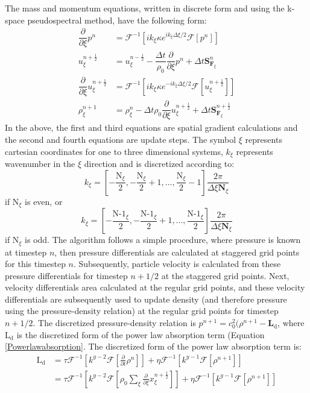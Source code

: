 \documentclass[10pt,a4paper]{article}
\begin{document}
The mass and momentum equations, written in discrete form and using the k-space pseudospectral method, have the following form:
\begin{align}
\dfrac{\partial}{\partial \xi} p^n &= \mathcal{F}^{-1} \left[ i k_{\xi} \kappa e^{ i k_{\xi} \Delta \xi /2} \mathcal{F} \left[ p^n \right] \right] \\
u_{\xi}^{n+\frac{1}{2}} &= u_{\xi}^{n-\frac{1}{2}} - \dfrac{\Delta t}{\rho_0} \dfrac{\partial}{\partial \xi} p^n + \Delta t \textbf{S}_{\textbf{F}_{\xi}}^n\\
\dfrac{\partial}{\partial \xi} u_{\xi}^{n+\frac{1}{2}} &= \mathcal{F}^{-1} \left[ i k_{\xi} \kappa e^{-ik_{\xi} \Delta \xi / 2} \mathcal{F} \left[ u_{\xi}^{n+\frac{1}{2}} \right] \right]\\
\rho_{\xi}^{n+1} &= \rho_{\xi}^n - \Delta t \rho_0 \dfrac{\partial}{\partial \xi} u_{\xi}^{n+\frac{1}{2}} + \Delta t  \textbf{S}_{\textbf{F}_{\xi}}^{n+\frac{1}{2}}
\end{align}
In the above, the first and third equations are spatial gradient calculations and the second and fourth equations are update steps. The symbol $\xi$ represents cartesian coordinates for one to three dimensional systems, $k_{\xi}$ represents wavenumber in the $\xi$ direction and is discretized according to: 
\begin{equation}
k_{\xi} = \left[-\dfrac{\text{N}_{\xi}}{2}, -\dfrac{\text{N}_{\xi}}{2}+1, ... , \dfrac{\text{N}_{\xi}}{2} -1 \right] \dfrac{2\pi}{\Delta \xi \textbf{N}_{\xi}}
\end{equation}
if N$_{\xi}$ is even, or 
\begin{equation}
k_{\xi} = \left[-\dfrac{\text{N-1}_{\xi}}{2}, -\dfrac{\text{N-1}_{\xi}}{2}+1, ... , \dfrac{\text{N-1}_{\xi}}{2} \right] \dfrac{2\pi}{\Delta \xi \textbf{N}_{\xi}}
\end{equation}
if N$_{\xi}$ is odd. The algorithm follows a simple procedure, where pressure is known at timestep $n$, then pressure differentials are calculated at staggered grid points for this timestep $n$. Subsequently, particle velocity is calculated from these pressure differentials for timestep $n+1/2$ at the staggered grid points. Next, velocity differentials area calculated at the regular grid points, and these velocity differentials are subsequently used to update density (and therefore pressure using the pressure-density relation) at the regular grid points for timestep $n+1/2$. The discretized pressure-density relation is $p^{n+1} = c_0^2(\rho^{n+1} - \textbf{L}_{\text{d}}$, where L$_{\text{d}}$ is the discretized form of the power law absorption term (Equation \ref{Powerlawabsorption}. The discretized form of the power law absorption term is:
\begin{align}
\text{L}_{\text{d}} &= \tau \mathcal{F}^{-1} \left[k^{y-2} \mathcal{F} \left[\frac{\partial}{\partial t} \rho^n \right] \right] + \eta \mathcal{F}^{-1} \left[ k^{y-1} \mathcal{F}\left[\rho^{n+1}\right] \right]\\
&= \tau \mathcal{F}^{-1} \left[k^{y-2} \mathcal{F} \left[\rho_0 \sum_{\xi} \frac{\partial}{\partial \xi} x_{\xi}^{n+\frac{1}{2}} \right] \right] + \eta \mathcal{F}^{-1} \left[ k^{y-1} \mathcal{F}\left[\rho^{n+1}\right] \right]
\end{align}
\end{document}
